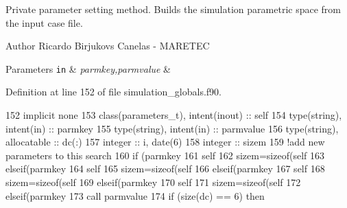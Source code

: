 Private parameter setting method. Builds the simulation parametric space from the input case file. 

\begin{DoxyAuthor}{Author}
Ricardo Birjukovs Canelas -\/ M\+A\+R\+E\+T\+EC
\end{DoxyAuthor}

\begin{DoxyParams}[1]{Parameters}
\mbox{\tt in}  & {\em parmkey,parmvalue} & \\
\hline
\end{DoxyParams}


Definition at line 152 of file simulation\+\_\+globals.\+f90.


\begin{DoxyCode}
152     \textcolor{keywordtype}{implicit none}
153     \textcolor{keywordtype}{class}(parameters\_t), \textcolor{keywordtype}{intent(inout)} :: self
154     \textcolor{keywordtype}{type}(string), \textcolor{keywordtype}{intent(in)} :: parmkey
155     \textcolor{keywordtype}{type}(string), \textcolor{keywordtype}{intent(in)} :: parmvalue
156     \textcolor{keywordtype}{type}(string), \textcolor{keywordtype}{allocatable} :: dc(:)
157     \textcolor{keywordtype}{integer} :: i, date(6)
158     \textcolor{keywordtype}{integer} :: sizem
159     \textcolor{comment}{!add new parameters to this search}
160     \textcolor{keywordflow}{if} (parmkey%
161         self%
162         sizem=sizeof(self%
163     \textcolor{keywordflow}{elseif}(parmkey%
164         self%
165         sizem=sizeof(self%
166     \textcolor{keywordflow}{elseif}(parmkey%
167         self%
168         sizem=sizeof(self%
169     \textcolor{keywordflow}{elseif}(parmkey%
170         self%
171         sizem=sizeof(self%
172     \textcolor{keywordflow}{elseif}(parmkey%
173         \textcolor{keyword}{call }parmvalue%
174         \textcolor{keywordflow}{if} (\textcolor{keyword}{size}(dc) == 6) \textcolor{keywordflow}{then}

\end{DoxyCode}
